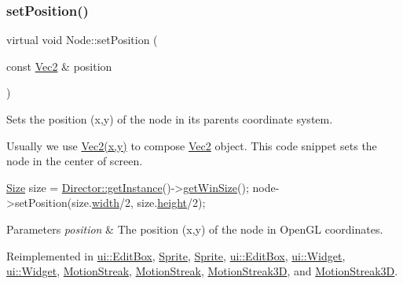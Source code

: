 \mbox{\label{classNode_a63f9ed194c372246c8018222d303faa7}} 
\subsubsection{\texorpdfstring{set\+Position()}{setPosition()}\hspace{0.1cm}{\footnotesize\ttfamily [2/4]}}
{\footnotesize\ttfamily virtual void Node\+::set\+Position (\begin{DoxyParamCaption}\item[{const \hyperlink{classVec2}{Vec2} \&}]{position }\end{DoxyParamCaption})\hspace{0.3cm}{\ttfamily [virtual]}}

Sets the position (x,y) of the node in its parent\textquotesingle{}s coordinate system.

Usually we use {\ttfamily \hyperlink{classVec2}{Vec2(x,y)}} to compose \hyperlink{classVec2}{Vec2} object. This code snippet sets the node in the center of screen. 
\begin{DoxyCode}
\hyperlink{classSize}{Size} size = \hyperlink{classDirector_a8d2a4ca9e20cd400ddadd516efa111e0}{Director::getInstance}()->\hyperlink{classDirector_af07668df4a8916e6eb0f79a93f6588fe}{getWinSize}();
node->setPosition(size.\hyperlink{classSize_af0be19024ddd79e7843492b3760c21f0}{width}/2, size.\hyperlink{classSize_a880fa21eaad5a5a0fe439d440776fd05}{height}/2);
\end{DoxyCode}



\begin{DoxyParams}{Parameters}
{\em position} & The position (x,y) of the node in Open\+GL coordinates. \\
\hline
\end{DoxyParams}


Reimplemented in \hyperlink{classui_1_1EditBox_a92e525c7152c0a974632d4810b392f11}{ui\+::\+Edit\+Box}, \hyperlink{classSprite_a0c950da6338ba62938d7b2af6eea8b39}{Sprite}, \hyperlink{classSprite_aace7c480af3721709b218bdc579f8903}{Sprite}, \hyperlink{classui_1_1EditBox_a9920fc994750f83db1c80be0417143f6}{ui\+::\+Edit\+Box}, \hyperlink{classui_1_1Widget_a290404b9d89d66e9f5bc7225fe68f2b5}{ui\+::\+Widget}, \hyperlink{classui_1_1Widget_ad1983665a8a2463e77c9ff7e13fcac97}{ui\+::\+Widget}, \hyperlink{classMotionStreak_a2b77305ae80661b9508b928cf0a1699d}{Motion\+Streak}, \hyperlink{classMotionStreak_a2d7df706b1ec462093363d18fd0baf58}{Motion\+Streak}, \hyperlink{classMotionStreak3D_a070710f82d947115207e9bfc0eeb4d30}{Motion\+Streak3D}, and \hyperlink{classMotionStreak3D_a8e4698c3850e094f90600e3ba4604651}{Motion\+Streak3D}.

